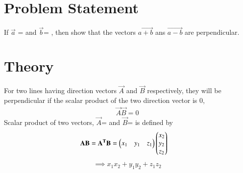 \documentclass[journal,12pt,twocolumn]{IEEEtran}
\begin{document}
\section{\textbf{Problem Statement}}
If $\vec{a}$ =  and $\vec{b}$= , then show that the vectors $\vec{a+b}$ ans $\vec{a-b}$ are perpendicular.
\section{\textbf{Theory}}
For two lines having direction vectors  $\vec{A}$ and  $\vec{B}$  respectively, they will be perpendicular if the scalar product of the two direction vector is 0, 
\begin{align}\label{eq2}
\vec{A}\vec{B} = 0
\end{align}
Scalar product of two vectors, $\vec{A}$=  and $\vec{B}$=  is defined by
\begin{align}\label{eq3}
\mathbf{A}\mathbf{B} &= \mathbf{A^T}\mathbf{B}= \begin{pmatrix} x_1&y_1&z_1\end{pmatrix}\begin{pmatrix} x_2 \\ y_2 \\ z_2 \end{pmatrix}
\end{align}
\begin{align}
\implies x_1x_2+y_1y_2+z_1z_2 
\end{align}
\end{document}
